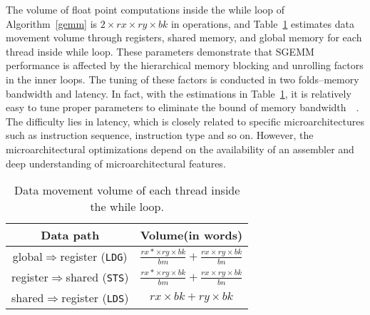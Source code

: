 The volume of float point computations inside the while loop of Algorithm~\ref{gemm} is $2\times rx\times ry \times bk$ 
in operations, and Table~\ref{tab:dm} estimates data movement volume through registers, shared memory, and global 
memory for each thread inside while loop.
These parameters demonstrate that SGEMM performance is affected by the hierarchical memory blocking and unrolling 
factors in the inner loops.
The tuning of these factors is conducted in two folds--memory bandwidth and latency. In fact, with the estimations in 
Table~\ref{tab:dm}, it is relatively easy to tune proper parameters to eliminate the bound of memory 
bandwidth~\cite{magma}~\cite{tan}. The difficulty lies in latency, which is closely related to specific 
microarchitectures such as instruction sequence, instruction type and so on. However, the microarchitectural 
optimizations depend on the availability of an assembler and deep understanding of microarchitectural features.

\begin{table}[htbp]
    \caption{Data movement volume of each thread inside the while loop.} %
\centering
\scalebox{1.0} {
\begin{tabular}{|c|c|}
\hline
    Data path& Volume(in words)\\
\hline
    global$\Rightarrow$register ({\tt LDG})& $\frac{rx*\times ry \times bk}{bm} + \frac{rx\times ry \times bk}{bn}$ \\
\hline
register$\Rightarrow$shared ({\tt STS})& $\frac{rx*\times ry \times bk}{bm} + \frac{rx\times ry \times bk}{bn}$ \\
\hline
shared$\Rightarrow$register ({\tt LDS})& $rx\times bk + ry\times bk$\\
\hline
\end{tabular}
}
\label{tab:dm}
\end{table}
